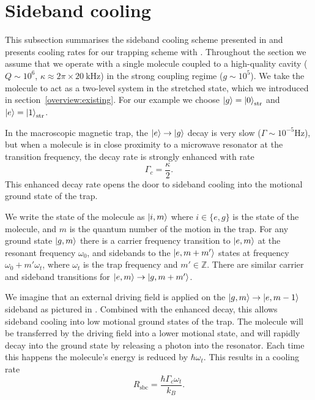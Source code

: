 \section{Sideband cooling}

This subsection summarises the sideband cooling scheme presented in
 and presents cooling rates for our trapping scheme with
\CaF{}.  Throughout the section we assume that we operate with a single
molecule coupled to a high-quality cavity ($Q\sim10^6$, $\kappa \approx
2\pi\times \SI{20}{\kilo\hertz}$) in the strong coupling regime ($g\sim10^5$).
We take the molecule to act as a two-level system in the stretched state, which
we introduced in section~\ref{overview:existing}.  For our example we choose
$\ket{g}=\ket{0}_\text{str}$ and $\ket{e}=\ket{1}_\text{str}$.

In the macroscopic magnetic trap, the
$\ket{e}\rightarrow\ket{g}$ decay is very slow ($\Gamma \sim
10^{-5}\si{\hertz}$), but when a molecule is in close proximity to a microwave
resonator at the transition frequency, the decay rate is strongly enhanced
with rate
%
\begin{equation}
  \Gamma_c = \frac{\kappa}{2}.
\end{equation}
%
This enhanced decay rate opens the door to sideband cooling into the motional
ground state of the trap.

We write the state of the molecule as $\ket{i, m}$ where $i\in\{e,g\}$ is the
state of the molecule, and $m$ is the quantum number of the motion
in the trap. For any ground state $\ket{g,m}$ there is a carrier frequency
transition to $\ket{e, m}$ at the resonant frequency $\omega_0$, and sidebands
to the $\ket{e, m+m'}$ states at frequency $\omega_0 + m'\omega_t$, where
$\omega_t$ is the trap frequency and $m'\in \mathbb{Z}$. There are similar
carrier and sideband transitions for $\ket{e,m} \rightarrow \ket{g, m+m'}$.

We imagine that an external driving field is applied on the
$\ket{g, m} \rightarrow \ket{e, m-1}$ sideband as pictured in
. Combined with the enhanced decay, this allows
sideband cooling into low motional ground states of the trap. The molecule will
be transferred by the driving field into a lower motional state, and will
rapidly decay into the ground state by releasing a photon into the resonator.
Each time this happens the molecule's energy is reduced by $\hbar\omega_t$.
This results in a cooling rate
%
\begin{equation}
  R_\text{sbc} = \frac{\hbar\Gamma_c\omega_t}{k_B}.
\end{equation}


